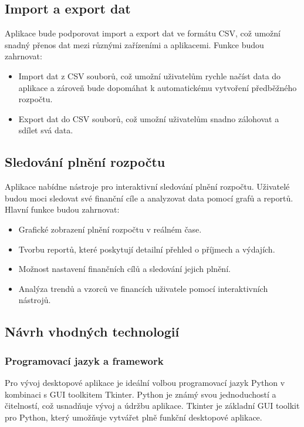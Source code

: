 \documentclass[
program=itk,
biblatex,
language=czech,
font=sans,
figures=false,
tables=false,
theorems,
sourcecodes,
glossaries,
index
]{kidiplom}
\begin{document}
\subsection{Import a export dat}
Aplikace bude podporovat import a export dat ve formátu CSV, což umožní snadný přenos dat mezi různými zařízeními a aplikacemi. Funkce budou zahrnovat:
\begin{itemize}
  \item Import dat z CSV souborů, což umožní uživatelům rychle načíst data do aplikace a zároveň bude dopomáhat k automatickému vytvoření předběžného rozpočtu. 
  \item Export dat do CSV souborů, což umožní uživatelům snadno zálohovat a sdílet svá data.
\end{itemize}

\subsection{Sledování plnění rozpočtu}
Aplikace nabídne nástroje pro interaktivní sledování plnění rozpočtu. Uživatelé budou moci sledovat své finanční cíle a analyzovat data pomocí grafů a reportů. Hlavní funkce budou zahrnovat:
\begin{itemize}
  \item Grafické zobrazení plnění rozpočtu v reálném čase.
  \item Tvorbu reportů, které poskytují detailní přehled o příjmech a výdajích.
  \item Možnost nastavení finančních cílů a sledování jejich plnění.
  \item Analýza trendů a vzorců ve financích uživatele pomocí interaktivních nástrojů.
\end{itemize}

\subsection{Návrh vhodných technologií}

\subsubsection{Programovací jazyk a framework}
Pro vývoj desktopové aplikace je ideální volbou programovací jazyk Python v kombinaci s GUI toolkitem Tkinter. Python je známý svou jednoduchostí a čitelností, což usnadňuje vývoj a údržbu aplikace. Tkinter je základní GUI toolkit pro Python, který umožňuje vytvářet plně funkční desktopové aplikace.
\end{document}
